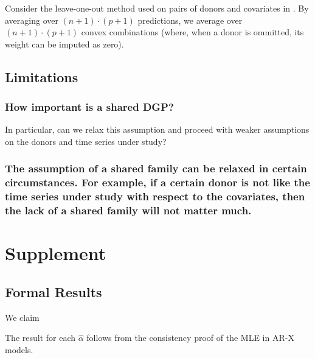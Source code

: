 \documentclass[11pt]{article}
\theoremstyle{definition}
\newenvironment{proof-of-proposition}[1][{}]{\noindent{\bf
    Proof of Proposition {#1}}
  \hspace*{.5em}}{\qed\bigskip\\}
\begin{document}
Consider the leave-one-out method used on pairs of donors and covariates in \cite{lundquist2024volatility}.  By averaging over $(n+1)\cdot (p+1)$ predictions, we average over $(n+1) \cdot (p + 1)$ convex combinations (where, when a donor is ommitted, its weight can be imputed as zero).

\subsection{Limitations}\label{Limitations}

\subsubsection{How important is a shared DGP?}
In particular, can we relax this assumption and proceed with weaker assumptions on the donors and time series under study?

\subsubsection{The assumption of a shared family can be relaxed in certain circumstances.  For example, if a certain donor is not like the time series under study with respect to the covariates, then the lack of a shared family will not matter much.}

\section{Supplement}

\subsection{Formal Results}

\begin{proof-of-proposition}[\ref{ARIMA_param_consistency}]
  We claim

  The result for each $\hat\alpha$ follows from the consistency proof of the MLE in AR-X models.
  
  \end{proof-of-proposition}
\end{document}
